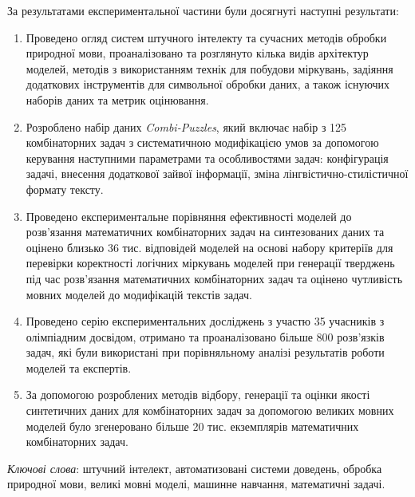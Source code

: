 За результатами експериментальної частини були досягнуті наступні результати:
\begin{enumerate}
    \item Проведено огляд систем штучного інтелекту та сучасних методів обробки природної мови, проаналізовано та розглянуто кілька видів архітектур моделей, методів з використанням технік для побудови міркувань, задіяння додаткових інструментів для символьної обробки даних, а також існуючих наборів даних та метрик оцінювання.
    \item Розроблено набір даних \emph{Combi-Puzzles}, який включає набір з 125 комбінаторних задач з систематичною модифікацією умов за допомогою керування наступними параметрами та особливостями задач: конфігурація задачі, внесення додаткової зайвої інформації, зміна лінгвістично-стилістичної формату тексту.
    \item Проведено експериментальне порівняння ефективності моделей до розв'язання математичних комбінаторних задач на синтезованих даних та оцінено близько 36 тис. відповідей моделей на основі набору критеріїв для перевірки коректності логічних міркувань моделей при генерації тверджень під час розв'язання математичних комбінаторних задач та оцінено чутливість мовних моделей до модифікацій текстів задач.
    \item Проведено серію експериментальних досліджень з участю 35 учасників з олімпіадним досвідом, отримано та проаналізовано більше 800 розв'язків задач, які були використані при порівняльному аналізі результатів роботи моделей та експертів.
    \item За допомогою розроблених методів відбору, генерації та оцінки якості синтетичних даних для комбінаторних задач за допомогою великих мовних моделей було згенеровано більше 20 тис. екземплярів математичних комбінаторних задач.
\end{enumerate}

\emph{Ключові слова}: штучний інтелект, автоматизовані системи доведень, обробка природної мови, великі мовні моделі, машинне навчання, математичні задачі.

\newpage
